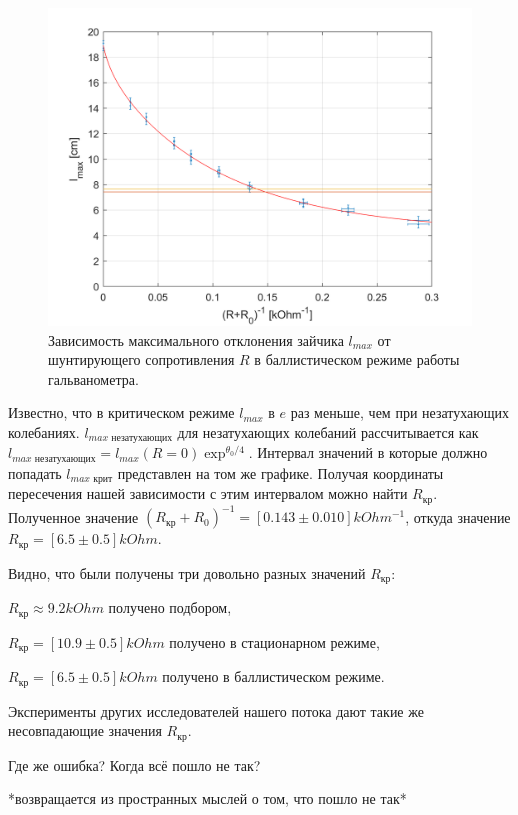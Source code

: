 \documentclass[a4paper,12pt]{article}
\begin{document}
\begin{figure}[h!]
   \centering
   \includegraphics[width=12cm]{PlotC.png} 
   \caption{Зависимость максимального отклонения зайчика $l_{max}$ от шунтирующего сопротивления $R$  в баллистическом режиме работы гальванометра.} 
   \label{PlotC} 
   \end{figure}
   
Известно, что в критическом режиме $l_{max}$ в $e$ раз меньше, чем при незатухающих колебаниях. $l_{max \text{ незатухающих}}$ для незатухающих колебаний рассчитывается как $l_{max \text{ незатухающих}} = l_{max}(R=0)\exp^{\theta_0/4}$. Интервал значений в которые должно попадать $l_{max \text{ крит}}$ представлен на том же графике. Получая координаты пересечения нашей зависимости с этим интервалом можно найти $R_\text{кр}$. Полученное значение $(R_\text{кр} + R_0)^{-1} = [0.143 \pm 0.010] kOhm^{-1}$, откуда значение  \textbf{$R_\text{кр} = [6.5 \pm 0.5] kOhm$}.

Видно, что были получены три довольно разных значений $R_\text{кр}$:\medskip

$R_\text{кр} \approx 9.2 kOhm$ получено подбором,\medskip

$R_\text{кр} =  [10.9 \pm 0.5]kOhm$ получено в стационарном режиме,\medskip

$R_\text{кр} = [6.5 \pm 0.5] kOhm$ получено в баллистическом режиме.\medskip

Эксперименты других исследователей нашего потока дают такие же несовпадающие значения  $R_\text{кр}$.

Где же ошибка? Когда всё пошло не так?

*возвращается из пространных мыслей о том, что пошло не так*\medskip
\end{document}
